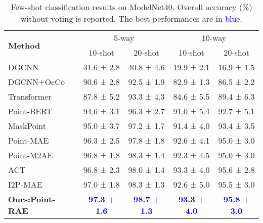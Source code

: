\documentclass[sigconf, screen]{acmart}
\begin{document}
\begin{table}
\caption{
 Few-shot classification results on ModelNet40. Overall accuracy (\%) without voting is reported. The best performances are in \textcolor{blue}{blue}.
}
\centering
\setlength{\tabcolsep}{0.9mm}
\begin{tabular}{@{}lcccc}
\toprule[1pt]
\multirow{2}{*}{\textbf{Method}}& \multicolumn{2}{c}{{5-way}}& \multicolumn{2}{c}{{10-way}}\\
\cmidrule[0.5pt](lr){2-3} \cmidrule[0.5pt](lr){4-5}
& 10-shot & 20-shot & 10-shot & 20-shot\\
\midrule[0.5pt]
DGCNN \cite{wang2019dynamic} &31.6 ± 2.8 &40.8 ± 4.6 &19.9 ± 2.1 &16.9 ± 1.5 \\
DGCNN+OcCo\cite{wang2021unsupervised} & 90.6 ± 2.8 &92.5 ± 1.9 &82.9 ± 1.3 &86.5 ± 2.2 \\
Transformer \cite{vaswani2017attention} &87.8 ± 5.2 &93.3 ± 4.3 &84.6 ± 5.5 &89.4 ± 6.3\\
Point-BERT \cite{yu2022point} &94.6 ± 3.1 &96.3 ± 2.7 &91.0 ± 5.4 &92.7 ± 5.1\\
MaskPoint \cite{liu2022masked} &95.0 ± 3.7 &97.2 ± 1.7 &91.4 ± 4.0 &93.4 ± 3.5\\
Point-MAE \cite{pang2022masked} & 96.3 ± 2.5 &97.8 ± 1.8 &92.6 ± 4.1 &95.0 ± 3.0\\
Point-M2AE \cite{zhang2022masked} & 96.8 ± 1.8 &98.3 ± 1.4 &92.3 ± 4.5 &95.0 ± 3.0\\
ACT \cite{dong2022autoencoders} &96.8 ± 2.3 &98.0 ± 1.4 &93.3 ± 4.0 &95.6 ± 2.8\\
I2P-MAE \cite{zhang2022learning} &97.0 ± 1.8 &98.3 ± 1.3 &92.6 ± 5.0 &95.5 ± 3.0\\
\textbf{Ours:Point-RAE}  &\textcolor{blue}{\bf 97.3 $\pm$1.6} &\textcolor{blue}{\bf 98.7 $\pm$1.3} &\textcolor{blue}{\bf 93.3 $\pm$4.0} &\textcolor{blue}{\bf 95.8 $\pm$3.0}\\


\bottomrule[1pt]

\end{tabular}
\label{few-shot}
\end{table}
\end{document}
